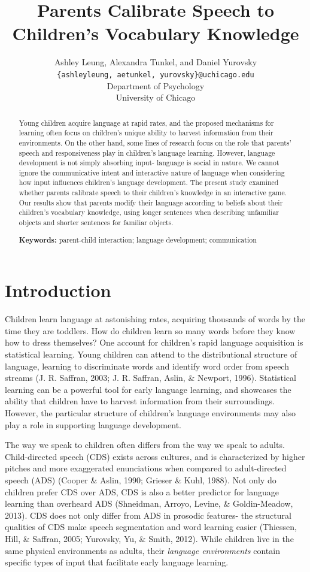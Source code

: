 \documentclass[10pt, letterpaper]{article}
\title{Parents Calibrate Speech to Children's Vocabulary Knowledge}
\author{Ashley Leung, Alexandra Tunkel, and Daniel Yurovsky \\
        \texttt{\{ashleyleung, aetunkel, yurovsky\}@uchicago.edu} \\
       Department of Psychology \\ University of Chicago}
\begin{document}
\maketitle

\begin{abstract}
Young children acquire language at rapid rates, and the proposed
mechanisms for learning often focus on children's unique ability to
harvest information from their environments. On the other hand, some
lines of research focus on the role that parents' speech and
responsiveness play in children's language learning. However, language
development is not simply absorbing input- language is social in nature.
We cannot ignore the communicative intent and interactive nature of
language when considering how input influences children's language
development. The present study examined whether parents calibrate speech
to their children's knowledge in an interactive game. Our results show
that parents modify their language according to beliefs about their
children's vocabulary knowledge, using longer sentences when describing
unfamiliar objects and shorter sentences for familiar objects.

\textbf{Keywords:}
parent-child interaction; language development; communication
\end{abstract}

\section{Introduction}\label{introduction}

Children learn language at astonishing rates, acquiring thousands of
words by the time they are toddlers. How do children learn so many words
before they know how to dress themselves? One account for children's
rapid language acquisition is statistical learning. Young children can
attend to the distributional structure of language, learning to
discriminate words and identify word order from speech streams (J. R.
Saffran, 2003; J. R. Saffran, Aslin, \& Newport, 1996). Statistical
learning can be a powerful tool for early language learning, and
showcases the ability that children have to harvest information from
their surroundings. However, the particular structure of children's
language environments may also play a role in supporting language
development.

The way we speak to children often differs from the way we speak to
adults. Child-directed speech (CDS) exists across cultures, and is
characterized by higher pitches and more exaggerated enunciations when
compared to adult-directed speech (ADS) (Cooper \& Aslin, 1990; Grieser
\& Kuhl, 1988). Not only do children prefer CDS over ADS, CDS is also a
better predictor for language learning than overheard ADS (Shneidman,
Arroyo, Levine, \& Goldin-Meadow, 2013). CDS does not only differ from
ADS in prosodic features- the structural qualities of CDS make speech
segmentation and word learning easier (Thiessen, Hill, \& Saffran, 2005;
Yurovsky, Yu, \& Smith, 2012). While children live in the same physical
environments as adults, their \emph{language environments} contain
specific types of input that facilitate early language learning.
\end{document}
